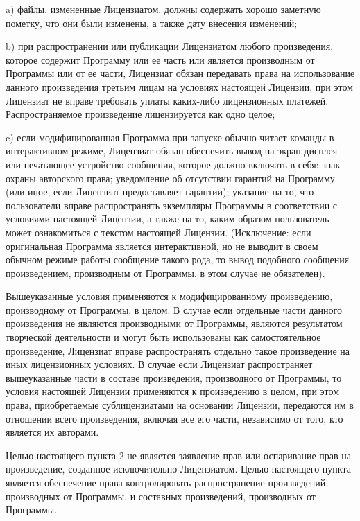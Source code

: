 \begin{small}
    a) файлы, измененные Лицензиатом, должны содержать хорошо заметную
пометку, что они были изменены, а также дату внесения изменений;

    b) при распространении или публикации Лицензиатом любого произведения,
которое содержит Программу или ее часть или является производным от
Программы или от ее части, Лицензиат обязан передавать права на
использование данного произведения третьим лицам на условиях настоящей
Лицензии, при этом Лицензиат не вправе требовать уплаты каких-либо
лицензионных платежей. Распространяемое произведение лицензируется как
одно целое;

    c) если модифицированная Программа при запуске обычно читает команды
в интерактивном режиме, Лицензиат обязан обеспечить вывод на экран
дисплея или печатающее устройство сообщения, которое должно включать в
себя: знак охраны авторского права; уведомление об отсутствии гарантий
на Программу (или иное, если Лицензиат предоставляет гарантии); указание
на то, что пользователи вправе распространять экземпляры Программы в
соответствии с условиями настоящей Лицензии, а также на то, каким
образом пользователь может ознакомиться с текстом настоящей Лицензии.
(Исключение: если оригинальная Программа является интерактивной, но не
выводит в своем обычном режиме работы сообщение такого рода, то вывод
подобного сообщения произведением, производным от Программы, в этом
случае не обязателен).

Вышеуказанные условия применяются к модифицированному произведению,
производному от Программы, в целом. В случае если отдельные части данного
произведения не являются производными от Программы, являются результатом
творческой деятельности и могут быть использованы как самостоятельное
произведение, Лицензиат вправе распространять отдельно такое произведение
на иных лицензионных условиях. В случае если Лицензиат распространяет
вышеуказанные части в составе произведения, производного от Программы, то
условия настоящей Лицензии применяются к произведению в целом, при этом
права, приобретаемые сублицензиатами на основании Лицензии, передаются им
в отношении всего произведения, включая все его части, независимо от того,
кто является их авторами.

Целью настоящего пункта 2 не является заявление прав или оспаривание прав
на произведение, созданное исключительно Лицензиатом. Целью настоящего
пункта является обеспечение права контролировать распространение
произведений, производных от Программы, и составных произведений,
производных от Программы.


\end{small}

